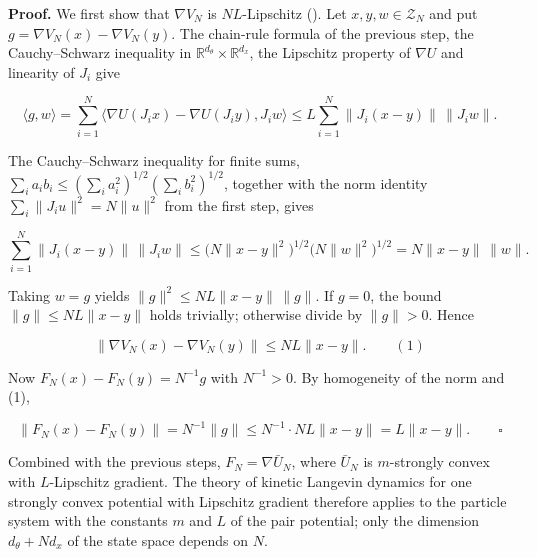 \documentclass[11pt,a4paper]{report}
\begin{document}
\textbf{Proof.} We first show that \(\nabla V_N\) is \(NL\)-Lipschitz (\cite[Section~3.1.4]{LangevinLean2026IPLA}). Let \(x,y,w\in\mathcal Z_N\) and put \(g=\nabla V_N(x)-\nabla V_N(y)\). The chain-rule formula of the previous step, the Cauchy–Schwarz inequality in \(\mathbb R^{d_\theta}\times\mathbb R^{d_x}\), the Lipschitz property of \(\nabla U\) and linearity of \(J_i\) give


\[\langle g,w\rangle=\sum_{i=1}^N\bigl\langle\nabla U(J_ix)-\nabla U(J_iy),J_iw\bigr\rangle\le L\sum_{i=1}^N\|J_i(x-y)\|\,\|J_iw\|.\]


The Cauchy–Schwarz inequality for finite sums, \(\sum_ia_ib_i\le(\sum_ia_i^2)^{1/2}(\sum_ib_i^2)^{1/2}\), together with the norm identity \(\sum_i\|J_iu\|^2=N\|u\|^2\) from the first step, gives


\[\sum_{i=1}^N\|J_i(x-y)\|\,\|J_iw\|\le\bigl(N\|x-y\|^2\bigr)^{1/2}\bigl(N\|w\|^2\bigr)^{1/2}=N\|x-y\|\,\|w\|.\]


Taking \(w=g\) yields \(\|g\|^2\le NL\|x-y\|\,\|g\|\). If \(g=0\), the bound \(\|g\|\le NL\|x-y\|\) holds trivially; otherwise divide by \(\|g\|>0\). Hence


\[\|\nabla V_N(x)-\nabla V_N(y)\|\le NL\|x-y\|.\qquad(1)\]


Now \(F_N(x)-F_N(y)=N^{-1}g\) with \(N^{-1}>0\). By homogeneity of the norm and (1),


\[\|F_N(x)-F_N(y)\|=N^{-1}\|g\|\le N^{-1}\cdot NL\|x-y\|=L\|x-y\|.\qquad\square\]


Combined with the previous steps, \(F_N=\nabla\bar U_N\), where \(\bar U_N\) is \(m\)-strongly convex with \(L\)-Lipschitz gradient. The theory of kinetic Langevin dynamics for one strongly convex potential with Lipschitz gradient therefore applies to the particle system with the constants \(m\) and \(L\) of the pair potential; only the dimension \(d_\theta+Nd_x\) of the state space depends on \(N\).
\end{document}
